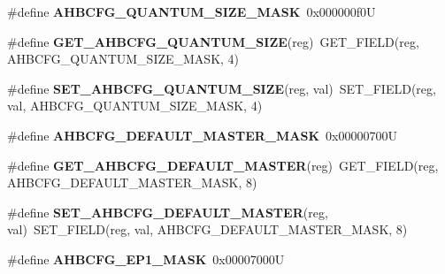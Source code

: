 \begin{DoxyCompactItemize}
\item 
\mbox{\label{group__lpc24xx__regs_ga9fadbe2b3a49484ddd225f983e50dff5}} 
\#define {\bfseries A\+H\+B\+C\+F\+G\+\_\+\+Q\+U\+A\+N\+T\+U\+M\+\_\+\+S\+I\+Z\+E\+\_\+\+M\+A\+SK}~0x000000f0U
\item 
\mbox{\label{group__lpc24xx__regs_ga8ea3882a61b70957b7e227b69a3bfdf7}} 
\#define {\bfseries G\+E\+T\+\_\+\+A\+H\+B\+C\+F\+G\+\_\+\+Q\+U\+A\+N\+T\+U\+M\+\_\+\+S\+I\+ZE}(reg)~G\+E\+T\+\_\+\+F\+I\+E\+LD(reg, A\+H\+B\+C\+F\+G\+\_\+\+Q\+U\+A\+N\+T\+U\+M\+\_\+\+S\+I\+Z\+E\+\_\+\+M\+A\+SK, 4)
\item 
\mbox{\label{group__lpc24xx__regs_ga7778effad20d3fec5cd61f4bb81299c4}} 
\#define {\bfseries S\+E\+T\+\_\+\+A\+H\+B\+C\+F\+G\+\_\+\+Q\+U\+A\+N\+T\+U\+M\+\_\+\+S\+I\+ZE}(reg,  val)~S\+E\+T\+\_\+\+F\+I\+E\+LD(reg, val, A\+H\+B\+C\+F\+G\+\_\+\+Q\+U\+A\+N\+T\+U\+M\+\_\+\+S\+I\+Z\+E\+\_\+\+M\+A\+SK, 4)
\item 
\mbox{\label{group__lpc24xx__regs_gafc2451c507ae78f80946b00326ba11f1}} 
\#define {\bfseries A\+H\+B\+C\+F\+G\+\_\+\+D\+E\+F\+A\+U\+L\+T\+\_\+\+M\+A\+S\+T\+E\+R\+\_\+\+M\+A\+SK}~0x00000700U
\item 
\mbox{\label{group__lpc24xx__regs_ga195790f87707c46ed9dc82daa30b700f}} 
\#define {\bfseries G\+E\+T\+\_\+\+A\+H\+B\+C\+F\+G\+\_\+\+D\+E\+F\+A\+U\+L\+T\+\_\+\+M\+A\+S\+T\+ER}(reg)~G\+E\+T\+\_\+\+F\+I\+E\+LD(reg, A\+H\+B\+C\+F\+G\+\_\+\+D\+E\+F\+A\+U\+L\+T\+\_\+\+M\+A\+S\+T\+E\+R\+\_\+\+M\+A\+SK, 8)
\item 
\mbox{\label{group__lpc24xx__regs_ga5571b7dc4b85f47dbafc1a4e8357181a}} 
\#define {\bfseries S\+E\+T\+\_\+\+A\+H\+B\+C\+F\+G\+\_\+\+D\+E\+F\+A\+U\+L\+T\+\_\+\+M\+A\+S\+T\+ER}(reg,  val)~S\+E\+T\+\_\+\+F\+I\+E\+LD(reg, val, A\+H\+B\+C\+F\+G\+\_\+\+D\+E\+F\+A\+U\+L\+T\+\_\+\+M\+A\+S\+T\+E\+R\+\_\+\+M\+A\+SK, 8)
\item 
\mbox{\label{group__lpc24xx__regs_ga420540a16c4093ba9dbfa71bcbb79f87}} 
\#define {\bfseries A\+H\+B\+C\+F\+G\+\_\+\+E\+P1\+\_\+\+M\+A\+SK}~0x00007000U
\item 
\mbox{\label{group__lpc24xx__regs_gad48c1019d3630fce9155fb92f54300a4}} 

\end{DoxyCompactItemize}
